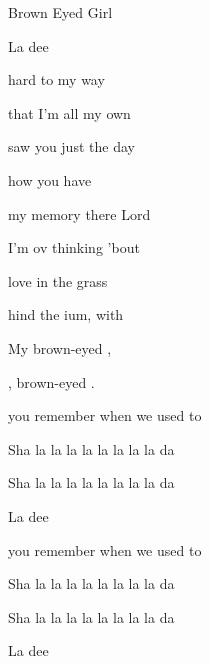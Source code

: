 \begin{SBSong}{Brown Eyed Girl}
\begin{SBChorus}
     La dee 
  \end{SBChorus}
  \CBPageBrk
  \begin{SBVerse}
     hard to  my way
  
     that I'm all  my own
  
     saw you just the  day
  
     how you have 
  
     my memory   there Lord
  
     I'm ov thinking 'bout
  
     love in the  grass
  
    hind the ium, with  
  \end{SBVerse}
  \begin{SBChorus}
     My brown-eyed , 
    
     ,  brown-eyed .
     
      you remember when we used to 
     
     Sha la la la  la la la la  la  da 
     
     Sha la la la  la la la la  la  da
     
     La dee 
     
     you remember when we used to 
     
     Sha la la la  la la la la  la  da 
     
     Sha la la la  la la la la  la  da
     
     La dee 
  \end{SBChorus}
\end{SBSong}
